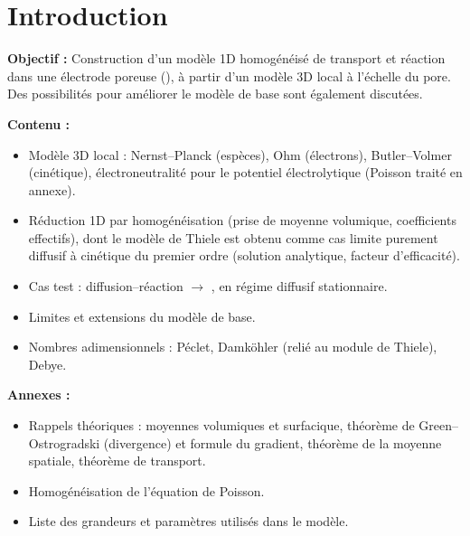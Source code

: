 \section*{Introduction}

\textbf{Objectif :} 
Construction d'un modèle 1D homogénéisé de transport
et réaction dans une électrode poreuse (), à partir d'un modèle
3D local à l'échelle du pore. Des possibilités pour améliorer le modèle
 de base sont également discutées. 
 
\textbf{Contenu :}
\begin{itemize}
    \item Modèle 3D local : Nernst--Planck (espèces), Ohm (électrons),
    Butler--Volmer (cinétique), électroneutralité pour le potentiel
    électrolytique (Poisson traité en annexe).
    \item Réduction 1D par homogénéisation (prise de moyenne volumique,
    coefficients effectifs), dont le modèle de Thiele est obtenu comme cas
    limite purement diffusif à cinétique du premier ordre (solution
    analytique, facteur d'efficacité).
    \item Cas test : diffusion--réaction  $\rightarrow$ ,
    en régime diffusif stationnaire.
    \item Limites et extensions du modèle de base.
    \item Nombres adimensionnels : Péclet, Damköhler (relié au module de
    Thiele), Debye.
\end{itemize}

\textbf{Annexes :}
\begin{itemize}
  \item Rappels théoriques : moyennes volumiques et surfacique, théorème de Green--Ostrogradski (divergence) et formule du gradient, théorème de la moyenne spatiale, théorème de transport.
  \item Homogénéisation de l'équation de Poisson.
  \item Liste des grandeurs et paramètres utilisés dans le modèle.
\end{itemize}

